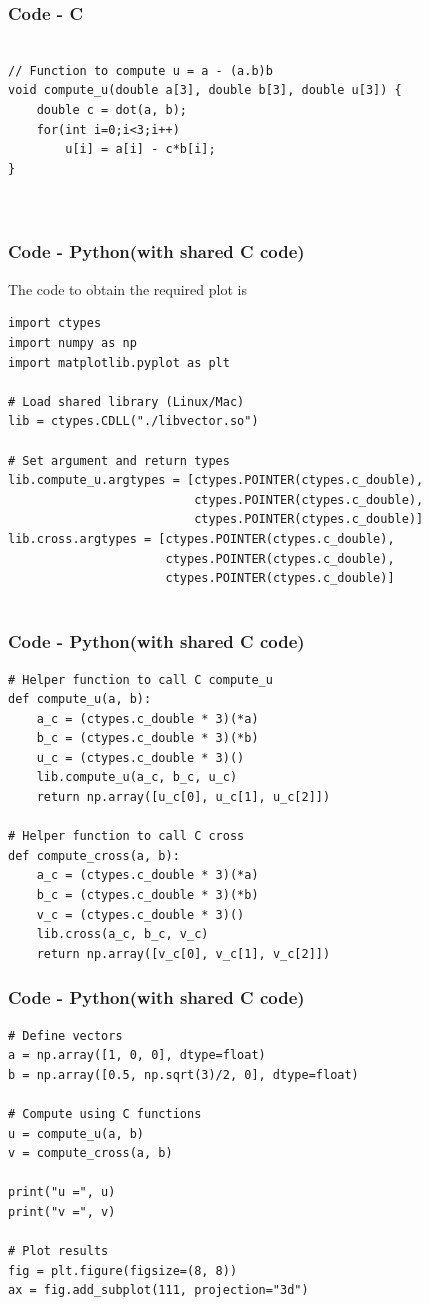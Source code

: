 \documentclass{beamer}
\theoremstyle{remark}
\numberwithin{equation}{section}
\begin{document}
\begin{frame}[fragile]
\frametitle{Code - C}
\begin{lstlisting}

// Function to compute u = a - (a.b)b
void compute_u(double a[3], double b[3], double u[3]) {
    double c = dot(a, b);
    for(int i=0;i<3;i++)
        u[i] = a[i] - c*b[i];
}



\end{lstlisting}
\end{frame}

\begin{frame}[fragile]
    \frametitle{Code - Python(with shared C code)}
    The code to obtain the required plot is
    \begin{lstlisting}
import ctypes
import numpy as np
import matplotlib.pyplot as plt

# Load shared library (Linux/Mac)
lib = ctypes.CDLL("./libvector.so")

# Set argument and return types
lib.compute_u.argtypes = [ctypes.POINTER(ctypes.c_double),
                          ctypes.POINTER(ctypes.c_double),
                          ctypes.POINTER(ctypes.c_double)]
lib.cross.argtypes = [ctypes.POINTER(ctypes.c_double),
                      ctypes.POINTER(ctypes.c_double),
                      ctypes.POINTER(ctypes.c_double)]


\end{lstlisting}
\end{frame}
\begin{frame}[fragile]
\frametitle{Code - Python(with shared C code)}
\begin{lstlisting}
# Helper function to call C compute_u
def compute_u(a, b):
    a_c = (ctypes.c_double * 3)(*a)
    b_c = (ctypes.c_double * 3)(*b)
    u_c = (ctypes.c_double * 3)()
    lib.compute_u(a_c, b_c, u_c)
    return np.array([u_c[0], u_c[1], u_c[2]])

# Helper function to call C cross
def compute_cross(a, b):
    a_c = (ctypes.c_double * 3)(*a)
    b_c = (ctypes.c_double * 3)(*b)
    v_c = (ctypes.c_double * 3)()
    lib.cross(a_c, b_c, v_c)
    return np.array([v_c[0], v_c[1], v_c[2]])

\end{lstlisting}
\end{frame}

\begin{frame}[fragile]
\frametitle{Code - Python(with shared C code)}
\begin{lstlisting}
# Define vectors
a = np.array([1, 0, 0], dtype=float)
b = np.array([0.5, np.sqrt(3)/2, 0], dtype=float)

# Compute using C functions
u = compute_u(a, b)
v = compute_cross(a, b)

print("u =", u)
print("v =", v)

# Plot results
fig = plt.figure(figsize=(8, 8))
ax = fig.add_subplot(111, projection="3d")

\end{lstlisting}
\end{frame}
\end{document}
